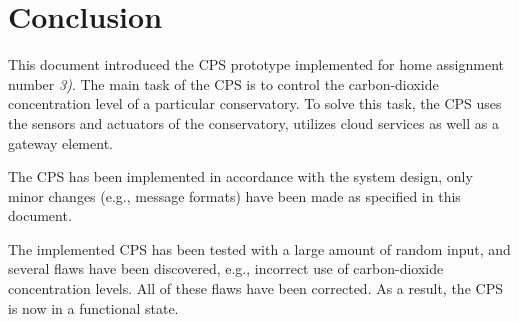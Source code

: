 \documentclass[a4paper, 11pt]{article}
\begin{document}
	\section{Conclusion}
	This document introduced the CPS prototype implemented for home assignment number \textit{3)}. The main task of the CPS is to control the carbon-dioxide concentration level of a particular conservatory. To solve this task, the CPS uses the sensors and actuators of the conservatory, utilizes cloud services as well as a gateway element.
	
	The CPS has been implemented in accordance with the system design, only minor changes (e.g., message formats) have been made as specified in this document.
	
	The implemented CPS has been tested with a large amount of random input, and several flaws have been discovered, e.g., incorrect use of carbon-dioxide concentration levels. All of these flaws have been corrected. As a result, the CPS is now in a functional state.
	
\end{document}
